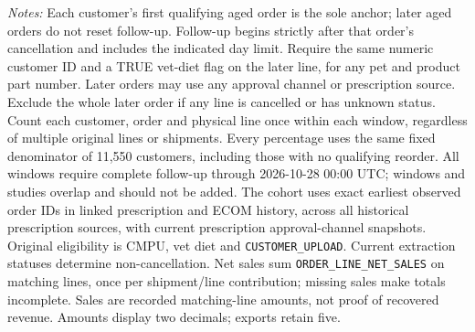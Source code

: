 \begin{table}[!htbp]
\begin{minipage}{\linewidth}
\footnotesize
\textit{Notes:} Each customer's first qualifying aged order is the sole anchor;
later aged orders do not reset follow-up. Follow-up begins strictly after that
order's cancellation and includes the indicated day limit. Require the same numeric customer ID and a TRUE vet-diet flag on the later line, for any pet and product part number. Later orders may use any approval channel or prescription
source. Exclude the whole later order if any line is cancelled or has unknown
status. Count each customer, order and physical line once within each window,
regardless of multiple original lines or shipments. Every percentage uses the
same fixed denominator of 11,550 customers, including those with no
qualifying reorder. All windows require complete follow-up through
2026-10-28 00:00 UTC; windows and studies overlap and should not be added.
The cohort uses exact earliest observed order IDs in linked prescription and
ECOM history, across all historical prescription sources, with current
prescription approval-channel snapshots. Original eligibility is CMPU,
vet diet and \texttt{CUSTOMER\_UPLOAD}. Current extraction statuses determine
non-cancellation. Net sales sum \texttt{ORDER\_LINE\_NET\_SALES} on matching
lines, once per shipment/line contribution; missing sales make totals incomplete.
Sales are recorded matching-line amounts, not proof of recovered revenue.
Amounts display two decimals; exports retain five.
\end{minipage}
\end{table}
